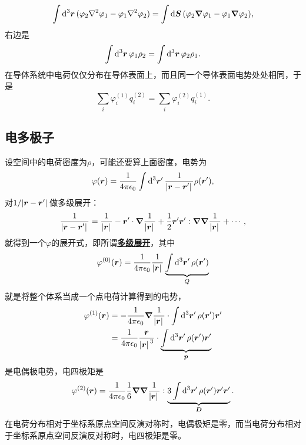\documentclass[UTF8, a4paper]{ctexart}
\newcommand*{\concept}[1]{\underline{\textbf{#1}}}
\begin{document}
\[
    \int \dd[3]{\vb*{r}} (\varphi_2 \laplacian{\varphi_1} - \varphi_1 \laplacian{\varphi_2}) = \int \dd{\vb*{S}} (\varphi_2 \grad{\varphi_1} - \varphi_1 \grad{\varphi_2}),
\]
右边是
\begin{equation}
    \int \dd[3]{\vb*{r}} \varphi_1 \rho_2 = \int \dd[3]{\vb*{r}} \varphi_2 \rho_1.
\end{equation}
在导体系统中电荷仅仅分布在导体表面上，而且同一个导体表面电势处处相同，于是
\begin{equation}
    \sum_i \varphi_i^{(1)} q_i^{(2)} = \sum_i \varphi_i^{(2)} q_i^{(1)}.
\end{equation}

\subsection{电多极子}

设空间中的电荷密度为$\rho$，可能还要算上面密度，电势为
\[
    \varphi(\vb*{r}) = \frac{1}{4\pi \epsilon_0} \int \dd[3]{\vb*{r}'} \frac{1}{\abs*{\vb*{r} - \vb*{r}'}} \rho(\vb*{r}'),
\]
对$1/\abs*{\vb*{r}-\vb*{r}'}$做多级展开：
\[
    \frac{1}{\abs*{\vb*{r}-\vb*{r}'}} = \frac{1}{\abs*{\vb*{r}}} - \vb*{r}' \cdot \grad{\frac{1}{\abs*{\vb*{r}}}} + \frac{1}{2} \vb*{r}' \vb*{r}' : \grad{\grad{\frac{1}{\abs*{\vb*{r}}}}} + \cdots,
\]
就得到一个$\varphi$的展开式，即所谓\concept{多级展开}，其中
\begin{equation}
    \varphi^{(0)}(\vb*{r}) = \frac{1}{4\pi \epsilon_0} \frac{1}{\abs*{\vb*{r}}} \underbrace{\int \dd[3]{\vb*{r}'} \rho(\vb*{r}')}_{Q}
\end{equation}
就是将整个体系当成一个点电荷计算得到的电势，
\begin{equation}
    \begin{aligned}
        \varphi^{(1)}(\vb*{r}) &= - \frac{1}{4\pi \epsilon_0} \grad{\frac{1}{\abs*{\vb*{r}}}} \cdot \int \dd[3]{\vb*{r}'} \rho(\vb*{r}') \vb*{r}' \\
        &= \frac{1}{4\pi \epsilon_0} \frac{\vb*{r}}{\abs*{\vb*{r}}^3} \cdot \underbrace{\int \dd[3]{\vb*{r}'} \rho(\vb*{r}') \vb*{r}'}_{\vb*{p}}
    \end{aligned}
\end{equation}
是电偶极电势，电四极矩是
\begin{equation}
    \varphi^{(2)}(\vb*{r}) = \frac{1}{4 \pi \epsilon_0} \frac{1}{6} \grad{\grad{\frac{1}{\abs*{\vb*{r}}}}} : \underbrace{3 \int \dd[3]{\vb*{r}'} \rho(\vb*{r}') \vb*{r}' \vb*{r}' }_{\vb*{D}}.
\end{equation}
在电荷分布相对于坐标系原点空间反演对称时，电偶极矩是零，而当电荷分布相对于坐标系原点空间反演反对称时，电四极矩是零。
\end{document}
